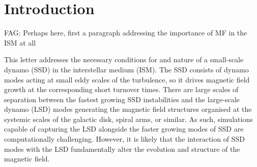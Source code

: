 \documentclass[preprint2]{aastex63}
\newcommand{\fag}[1]{\textcolor{midgreen}{FAG: #1}}
\begin{document}
\section{Introduction} \label{sec:intro}
\fag{Perhaps here, first a paragraph addressing the importance of MF in the ISM
at all}


This letter addresses the necessary conditions for and nature of a small-scale
dynamo (SSD) in the interstellar medium (ISM).
The SSD consists of dynamo modes acting at small eddy scales of the
turbulence,
   so it drives magnetic field growth at the corresponding short
   turnover times.
There are large scales of separation between the fastest growing SSD
instabilities and the large-scale dynamo (LSD) modes generating the magnetic
field structures organised at the systemic scales of the galactic disk, spiral
arms, or similar.
As such, simulations capable of capturing the LSD alongside the faster
growing modes of SSD are computationally challenging.
However, it is likely that the interaction of SSD modes with the LSD fundamentally
alter the evolution and structure of the magnetic field.
\end{document}
